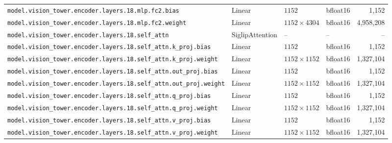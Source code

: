 \documentclass[10pt,a4paper]{article}
\theoremstyle{definition}
\begin{document}
\begin{appendices}
{\begin{longtable}{p{6.8cm}>{\raggedright\arraybackslash}p{3.3cm}llr}
\texttt{model.\allowbreak{}vision\_tower.\allowbreak{}encoder.\allowbreak{}layers.\allowbreak{}18.\allowbreak{}mlp.\allowbreak{}fc2.\allowbreak{}bias} & Linear & $1152$ & bfloat16 & 1,152 \\
\texttt{model.\allowbreak{}vision\_tower.\allowbreak{}encoder.\allowbreak{}layers.\allowbreak{}18.\allowbreak{}mlp.\allowbreak{}fc2.\allowbreak{}weight} & Linear & $1152 \times 4304$ & bfloat16 & 4,958,208 \\
\texttt{model.\allowbreak{}vision\_tower.\allowbreak{}encoder.\allowbreak{}layers.\allowbreak{}18.\allowbreak{}self\_attn} & Siglip\allowbreak{}Attention & -- & -- & -- \\
\texttt{model.\allowbreak{}vision\_tower.\allowbreak{}encoder.\allowbreak{}layers.\allowbreak{}18.\allowbreak{}self\_attn.\allowbreak{}k\_proj.\allowbreak{}bias} & Linear & $1152$ & bfloat16 & 1,152 \\
\texttt{model.\allowbreak{}vision\_tower.\allowbreak{}encoder.\allowbreak{}layers.\allowbreak{}18.\allowbreak{}self\_attn.\allowbreak{}k\_proj.\allowbreak{}weight} & Linear & $1152 \times 1152$ & bfloat16 & 1,327,104 \\
\texttt{model.\allowbreak{}vision\_tower.\allowbreak{}encoder.\allowbreak{}layers.\allowbreak{}18.\allowbreak{}self\_attn.\allowbreak{}out\_proj.\allowbreak{}bias} & Linear & $1152$ & bfloat16 & 1,152 \\
\texttt{model.\allowbreak{}vision\_tower.\allowbreak{}encoder.\allowbreak{}layers.\allowbreak{}18.\allowbreak{}self\_attn.\allowbreak{}out\_proj.\allowbreak{}weight} & Linear & $1152 \times 1152$ & bfloat16 & 1,327,104 \\
\texttt{model.\allowbreak{}vision\_tower.\allowbreak{}encoder.\allowbreak{}layers.\allowbreak{}18.\allowbreak{}self\_attn.\allowbreak{}q\_proj.\allowbreak{}bias} & Linear & $1152$ & bfloat16 & 1,152 \\
\texttt{model.\allowbreak{}vision\_tower.\allowbreak{}encoder.\allowbreak{}layers.\allowbreak{}18.\allowbreak{}self\_attn.\allowbreak{}q\_proj.\allowbreak{}weight} & Linear & $1152 \times 1152$ & bfloat16 & 1,327,104 \\
\texttt{model.\allowbreak{}vision\_tower.\allowbreak{}encoder.\allowbreak{}layers.\allowbreak{}18.\allowbreak{}self\_attn.\allowbreak{}v\_proj.\allowbreak{}bias} & Linear & $1152$ & bfloat16 & 1,152 \\
\texttt{model.\allowbreak{}vision\_tower.\allowbreak{}encoder.\allowbreak{}layers.\allowbreak{}18.\allowbreak{}self\_attn.\allowbreak{}v\_proj.\allowbreak{}weight} & Linear & $1152 \times 1152$ & bfloat16 & 1,327,104 \\

\end{longtable}}
\end{appendices}
\end{document}
